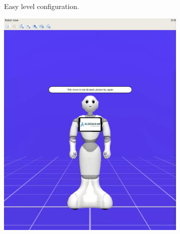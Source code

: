 \documentclass{article}
\begin{document}
\begin{figure}[H]
    \centering
    \begin{subfigure}{.33\textwidth}
      \centering
      \caption{Easy level configuration.}
    \end{subfigure}%
    \begin{subfigure}{.33\textwidth}
      \centering
      \includegraphics[width=0.9\linewidth]{images/9_mossa invalida.png}

\end{subfigure}
\end{figure}
\end{document}
